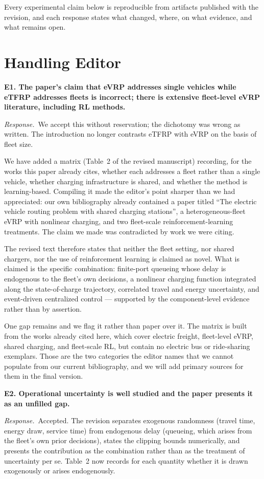 \documentclass[11pt]{article}
\newcommand{\comment}[1]{\medskip\noindent\textbf{#1}\par\nopagebreak\smallskip}
\newcommand{\reply}{\noindent\textit{Response.}\ }
\begin{document}
\noindent Every experimental claim below is reproducible from artifacts
published with the revision, and each response states what changed, where, on
what evidence, and what remains open.

\section*{Handling Editor}

\comment{E1. The paper's claim that eVRP addresses single vehicles while eTFRP
addresses fleets is incorrect; there is extensive fleet-level eVRP literature,
including RL methods.}
\reply We accept this without reservation; the dichotomy was wrong as written.
The introduction no longer contrasts eTFRP with eVRP on the basis of fleet size.

We have added a matrix (Table~2 of the revised manuscript) recording, for the
works this paper already cites, whether each addresses a fleet rather than a
single vehicle, whether charging infrastructure is shared, and whether the
method is learning-based. Compiling it made the editor's point sharper than we
had appreciated: our own bibliography already contained a paper titled ``The
electric vehicle routing problem with shared charging stations'', a
heterogeneous-fleet eVRP with nonlinear charging, and two fleet-scale
reinforcement-learning treatments. The claim we made was contradicted by work we
were citing.

The revised text therefore states that neither the fleet setting, nor shared
chargers, nor the use of reinforcement learning is claimed as novel. What is
claimed is the specific combination: finite-port queueing whose delay is
endogenous to the fleet's own decisions, a nonlinear charging function
integrated along the state-of-charge trajectory, correlated travel and energy
uncertainty, and event-driven centralized control --- supported by the
component-level evidence rather than by assertion.

One gap remains and we flag it rather than paper over it. The matrix is built
from the works already cited here, which cover electric freight, fleet-level
eVRP, shared charging, and fleet-scale RL, but contain no electric bus or
ride-sharing exemplars. Those are the two categories the editor names that we
cannot populate from our current bibliography, and we will add primary sources
for them in the final version.

\comment{E2. Operational uncertainty is well studied and the paper presents it
as an unfilled gap.}
\reply Accepted. The revision separates exogenous randomness (travel time,
energy draw, service time) from endogenous delay (queueing, which arises from
the fleet's own prior decisions), states the clipping bounds numerically, and
presents the contribution as the combination rather than as the treatment of
uncertainty per se. Table~2 now records for each quantity whether it is drawn
exogenously or arises endogenously.
\end{document}
